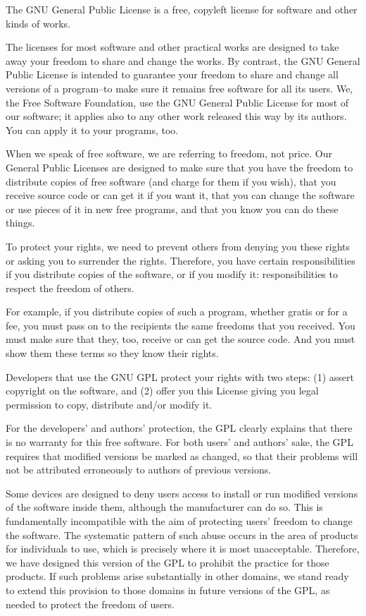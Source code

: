 \documentclass[a4paper,10pt,DIV=15,openany]{scrbook}
\begin{document}
{\begin{shaded}

The GNU General Public License is a free, copyleft license for
software and other kinds of works.

The licenses for most software and other practical works are designed
to take away your freedom to share and change the works.  By contrast,
the GNU General Public License is intended to guarantee your freedom to
share and change all versions of a program--to make sure it remains free
software for all its users.  We, the Free Software Foundation, use the
GNU General Public License for most of our software; it applies also to
any other work released this way by its authors.  You can apply it to
your programs, too.

When we speak of free software, we are referring to freedom, not
price.  Our General Public Licenses are designed to make sure that you
have the freedom to distribute copies of free software (and charge for
them if you wish), that you receive source code or can get it if you
want it, that you can change the software or use pieces of it in new
free programs, and that you know you can do these things.

To protect your rights, we need to prevent others from denying you
these rights or asking you to surrender the rights.  Therefore, you have
certain responsibilities if you distribute copies of the software, or if
you modify it: responsibilities to respect the freedom of others.

For example, if you distribute copies of such a program, whether
gratis or for a fee, you must pass on to the recipients the same
freedoms that you received.  You must make sure that they, too, receive
or can get the source code.  And you must show them these terms so they
know their rights.

Developers that use the GNU GPL protect your rights with two steps:
(1) assert copyright on the software, and (2) offer you this License
giving you legal permission to copy, distribute and/or modify it.

For the developers' and authors' protection, the GPL clearly explains
that there is no warranty for this free software.  For both users' and
authors' sake, the GPL requires that modified versions be marked as
changed, so that their problems will not be attributed erroneously to
authors of previous versions.

Some devices are designed to deny users access to install or run
modified versions of the software inside them, although the manufacturer
can do so.  This is fundamentally incompatible with the aim of
protecting users' freedom to change the software.  The systematic
pattern of such abuse occurs in the area of products for individuals to
use, which is precisely where it is most unacceptable.  Therefore, we
have designed this version of the GPL to prohibit the practice for those
products.  If such problems arise substantially in other domains, we
stand ready to extend this provision to those domains in future versions
of the GPL, as needed to protect the freedom of users.


\end{shaded}}
\end{document}
